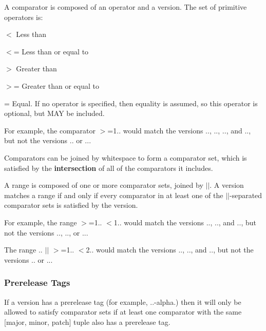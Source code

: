 A {\ttfamily comparator} is composed of an {\ttfamily operator} and a {\ttfamily version}. The set of primitive {\ttfamily operators} is\+:


\begin{DoxyItemize}
\item {\ttfamily $<$} Less than
\item {\ttfamily $<$=} Less than or equal to
\item {\ttfamily $>$} Greater than
\item {\ttfamily $>$=} Greater than or equal to
\item {\ttfamily =} Equal. If no operator is specified, then equality is assumed, so this operator is optional, but M\+A\+Y be included.
\end{DoxyItemize}

For example, the comparator {\ttfamily $>$=1..} would match the versions {..}, {..}, {..}, and {..}, but not the versions {..} or {..}.

Comparators can be joined by whitespace to form a {\ttfamily comparator set}, which is satisfied by the {\bfseries intersection} of all of the comparators it includes.

A range is composed of one or more comparator sets, joined by {\ttfamily $\vert$$\vert$}. A version matches a range if and only if every comparator in at least one of the {\ttfamily $\vert$$\vert$}-\/separated comparator sets is satisfied by the version.

For example, the range {\ttfamily $>$=1.. $<$1..} would match the versions {..}, {..}, and {..}, but not the versions {..}, {..}, or {..}.

The range {.. $\vert$$\vert$ $>$=1.. $<$2..} would match the versions {..}, {..}, and {..}, but not the versions {..} or {..}.

\subsubsection*{Prerelease Tags}

If a version has a prerelease tag (for example, {..-\/alpha.}) then it will only be allowed to satisfy comparator sets if at least one comparator with the same {\ttfamily \mbox{[}major, minor, patch\mbox{]}} tuple also has a prerelease tag.

